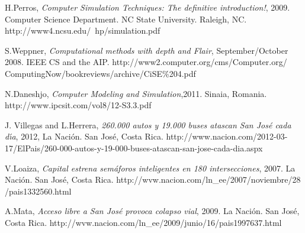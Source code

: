 \documentclass[conference]{IEEEtran}
\begin{document}
%
%
\begin{thebibliography}{1}

H.Perros, \emph{Computer Simulation Techniques:
The definitive introduction!}, 2009. Computer Science Department. NC State University. Raleigh, NC. http://www4.ncsu.edu/~hp/simulation.pdf

S.Weppner, \emph{Computational methods with depth and Flair}, September/October 2008. IEEE CS and the AIP. http://www2.computer.org/cms/Computer.org/
ComputingNow/bookreviews/archive/CiSE\%204.pdf 

N.Daneshjo, \emph{Computer Modeling and Simulation},2011. Sinaia, Romania.
http://www.ipcsit.com/vol8/12-S3.3.pdf

J. Villegas and L.Herrera, \emph{260.000 autos y 19.000 buses atascan San Jos\'{e} cada d\'{\i}a}, 2012, La Naci\'{o}n. San Jos\'{e}, Costa Rica. http://www.nacion.com/2012-03-17/ElPais/260-000-autos-y-19-000-buses-atascan-san-jose-cada-dia.aspx

 V.Loaiza, \emph{Capital estrena sem\'{a}foros inteligentes en 180 intersecciones}, 2007. La Naci\'{o}n. San Jos\'{e}, Costa Rica. 
http://wvw.nacion.com/ln\_ee/2007/noviembre/28
/pais1332560.html

A.Mata, \emph{Acceso libre a San Jos\'{e} provoca colapso vial}, 2009. La Naci\'{o}n. San Jos\'{e}, Costa Rica. 
http://wvw.nacion.com/ln\_ee/2009/junio/16/pais1997637.html

\end{thebibliography}




%
%
\end{document}
